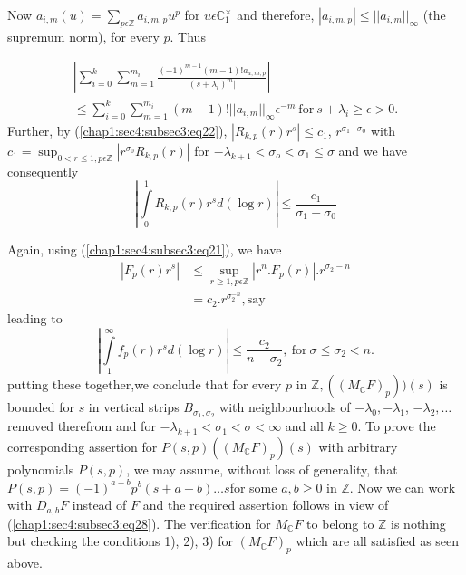 Now
 ${a_{i,m}}(u)=\sum\limits_{p\epsilon\mathbb{Z}}a_{i,m,p}u^{p}$ for
$u\epsilon {\mathbb{C}}_{1}^\times$ and therefore,
$|a_{i,m,p}|\le||a_{i,m}||_{\infty}$ (the supremum norm), for every
$p$. Thus

\begin{multline*}
  \left|\sum\limits_{i=0}^{k}\sum\limits_{m=1}^{m_{i}}
  \frac{(-1)^{m-1}(m-1)!{a_{a,m,p}}}{{(s+\lambda_{i})}^{m}|} \right|\\
  \le \sum\limits_{i=0}^{k} \sum\limits_{m=1}^{m_{i}}(m-1)!| |a_{i,m}|
  |_{\infty}\epsilon^{-m}  ~\text{for}~ s+\lambda_{i}\ge\epsilon>0. 
\end{multline*}
Further,\pageoriginale
by (\ref{chap1:sec4:subsec3:eq22}), $|R_{k,p}(r)r^{s}|\le c_{1}$,
$r^{{\sigma}_{1}{-\sigma_{0}}}$ with 
$c_{1}={\displaystyle{\mathop{\sup}_{0 < r \le 1,p \epsilon
      \mathbb{Z}}}}|r^{\sigma_0}R_{k,p}(r)|$ 
for $-\lambda_{k+1}<\sigma_{o}<\sigma_{1}\le \sigma $ and we have
consequently
\begin{equation*}
\left|\int\limits_{0}^{1}R_{k,p}(r)r^sd(\log r)\right|\le \frac{c_1}{\sigma_{1}-\sigma_{0}}
\end{equation*}

Again, using (\ref{chap1:sec4:subsec3:eq21}), we have 
\begin{align*}
\left|F_{p}(r)r^s\right| & \le {\displaystyle{\mathop{\sup}_{r\ge1,p\epsilon\mathbb{Z}}}}\left|r^{n}.F_{p}(r)\right|.r^{\sigma_{2}-n}\\
               & = c_{2}.r^{\sigma_{2}^{-n}}, \text{say}
\end{align*}
leading to 
\begin{equation*}
  \left|\int\limits_{1}^{\infty}f_{p}(r)r^{s}d(\log r)\right|\le
\frac{c_{2}}{n-\sigma_{2}}, ~\text{for}~ \sigma\le\sigma_{2}<n.
\end{equation*}
putting these together,we conclude that for every $p$ in
$\mathbb{Z},((M_{\mathbb{C}}F)_{p}))(s)$ is bounded for $s$ in vertical
strips $B_{\sigma_{1},\sigma_{2}}$ with neighbourhoods of
$-\lambda_{0},-\lambda_{1}$, $-\lambda_{2},\ldots$ removed therefrom and
for $-\lambda_{k+1}<\sigma_1<\sigma<\infty$ and all $k\ge 0$. To
prove the corresponding assertion for
$P(s,p)((M_{\mathbb{C}}F)_{p})(s)$ with arbitrary polynomials
$P(s,p)$, we may assume, without loss of generality, that
$P(s,p)=(-1)^{a+b}p^{b}(s+a-b)\ldots s$for some $a,b\ge 0$ in
$\mathbb{Z}$. Now we can work with $D_{a,b}F$ instead of $F$ and the
required assertion follows in view of
(\ref{chap1:sec4:subsec3:eq28}). The verification for 
$M_{\mathbb{C}}F$ to belong to $\mathbb{Z}$ is nothing but checking
the conditions 1), 2), 3)  for $(M_{\mathbb{C}}F)_{p}$ which are all
satisfied as seen above.

